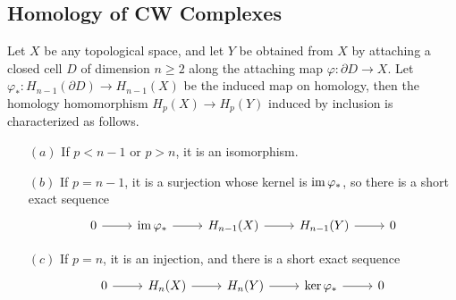 \subsection{Homology of CW Complexes}
\begin{proposition}\label{homology attach}
Let $X$ be any topological space, and let $Y$ be obtained from $X$ by attaching a closed cell $D$ of dimension $n\geq2$ along the attaching map $\varphi:\partial D\to X$. 
Let $\varphi_*:H_{n-1}(\partial D)\to H_{n-1}(X)$ be the induced map on homology, then the homology homomorphism $H_p(X)\to H_p(Y)$ induced by inclusion is 
characterized as follows.
\begin{itemize}
\item[$(a)$]If $p<n-1$ or $p>n$, it is an isomorphism.
\item[$(b)$]If $p=n-1$, it is a surjection whose kernel is $\mathrm{im}\,\varphi_*$, so there is a short exact sequence
\[\begin{tikzcd}
0\ar[r]&\im\varphi_*\ar[r]&H_{n-1}(X)\ar[r]&H_{n-1}(Y)\ar[r]&0
\end{tikzcd}\]
\item[$(c)$]If $p=n$, it is an injection, and there is a short exact sequence
\[\begin{tikzcd}
0\ar[r]&H_n(X)\ar[r]&H_n(Y)\ar[r]&\ker\varphi_*\ar[r]&0
\end{tikzcd}\]
\end{itemize}
\end{proposition}
